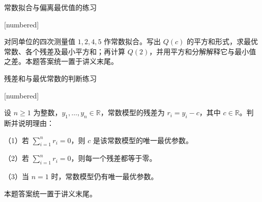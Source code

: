 \documentclass[aspectratio=169,10pt,fontset=fandol]{ctexbeamer}
\makeatletter
\newcommand{\mathagentexerciselabelcontext}[1]{%
\hypertarget<1>{#1}{}%
\edef\@currentHref{#1}%
}
\makeatother
\begin{document}
\begin{frame}[t,fragile]{常数拟合与偏离最优值的练习}
\normalsize
{\normalsize
[numbered]
\mathagentexerciselabelcontext{mathagent.exercise.U0014.0}
\begin{exercise}
\label{mathagent:exercise:79e91357ee05b8b9aa4c657d553157f1ef411624d282c3f2337dd0e01453ce2d}
对同单位的四次测量值 $1,2,4,5$ 作常数拟合。写出 $Q(c)$ 的平方和形式，求最优常数、各个残差及最小平方和；再计算 $Q(2)$，并用平方和分解解释它与最小值之差。本题答案统一置于讲义末尾。
\end{exercise}
}
\end{frame}
\begin{frame}[t,fragile]{残差和与最优常数的判断练习}
\normalsize
{\normalsize
[numbered]
\mathagentexerciselabelcontext{mathagent.exercise.U0015.0}
\begin{exercise}
\label{mathagent:exercise:9e7dbf7ef17df1506f236bbf1ad6ff8c14ff13065df89e12b796d18475228be7}
设 $n\geq1$ 为整数，$y_1,\ldots,y_n\in\mathbb{R}$，常数模型的残差为 $r_i=y_i-c$，其中 $c\in\mathbb{R}$。判断并说明理由：

（1）若 $\sum_{i=1}^{n}r_i=0$，则 $c$ 是该常数模型的唯一最优参数。

（2）若 $\sum_{i=1}^{n}r_i=0$，则每一个残差都等于零。

（3）当 $n=1$ 时，常数模型仍有唯一最优参数。

本题答案统一置于讲义末尾。
\end{exercise}
}
\end{frame}
\end{document}
